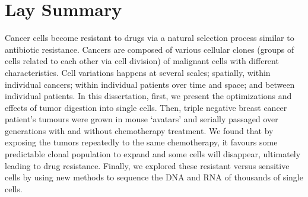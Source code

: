 

 \chapter{Lay Summary}

Cancer cells become resistant to drugs via a natural selection process similar to antibiotic resistance. Cancers are composed of various cellular clones (groups of cells related to each other via cell division) of malignant cells with different characteristics. Cell variations happens at several scales; spatially, within individual cancers; within individual patients over time and space; and between individual patients. In this dissertation, first, we present the optimizations and effects of tumor digestion into single cells. Then, triple negative breast cancer patient’s tumours were grown in mouse `avatars' and serially passaged over generations with and without chemotherapy treatment. We found that by exposing the tumors repeatedly to the same chemotherapy, it favours some predictable clonal population to expand and some cells will disappear, ultimately leading to drug resistance. Finally, we explored these resistant versus sensitive cells by using new methods to sequence the DNA and RNA of thousands of single cells.




